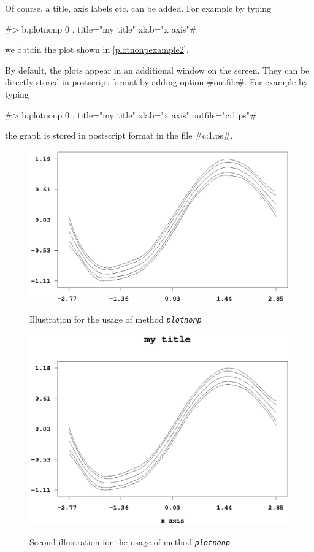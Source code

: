Of course, a title, axis labels etc. can be added. For example by
typing

#> b.plotnonp 0 , title="my title" xlab="x axis"#

we obtain the plot shown in \autoref{plotnonpexample2}.

By default, the plots appear in an additional window on the
screen. They can be directly stored in postscript format by adding
option #outfile#. For example by typing

 #> b.plotnonp 0 , title="my title" xlab="x axis" outfile="c:\results\result1.ps"#

the graph is stored in postscript format in the file
#c:\results\result1.ps#.


\begin{figure}[ht]
\begin{center}
\includegraphics[scale=0.8]{grafiken/plotnonpexample.ps}
{\em\caption{ \label{plotnonpexample1} Illustration for the usage
of method \em\tt plotnonp}}
\end{center}
\end{figure}


\begin{figure}[ht]
\begin{center}
\includegraphics[scale=0.8]{grafiken/plotnonpexample2.ps}
{\em\caption{ \label{plotnonpexample2} Second illustration for the
usage of method \em\tt plotnonp}}
\end{center}
\end{figure}

